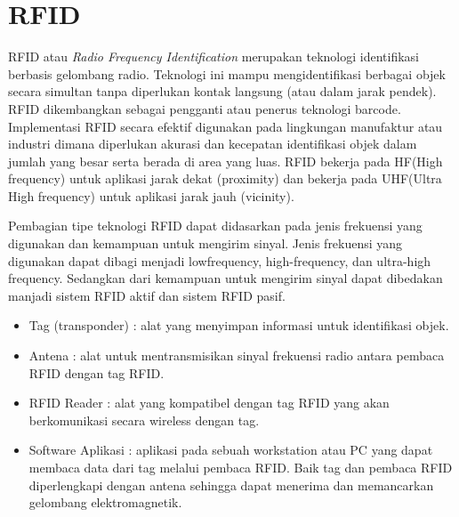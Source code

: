 \section{RFID}
RFID atau \textit{Radio Frequency Identification} merupakan teknologi identifikasi berbasis gelombang radio. Teknologi ini mampu mengidentifikasi berbagai objek secara simultan tanpa diperlukan kontak langsung (atau dalam jarak pendek). RFID dikembangkan sebagai pengganti atau penerus teknologi barcode. Implementasi RFID secara efektif digunakan pada lingkungan manufaktur atau industri dimana diperlukan akurasi dan kecepatan identifikasi objek dalam jumlah yang besar serta berada di area yang luas. RFID bekerja pada HF(High frequency) untuk aplikasi jarak dekat (proximity) dan bekerja pada UHF(Ultra High frequency) untuk aplikasi jarak jauh (vicinity).

Pembagian tipe teknologi RFID dapat didasarkan pada jenis frekuensi yang digunakan dan kemampuan untuk mengirim sinyal. Jenis frekuensi yang digunakan dapat dibagi menjadi lowfrequency, high-frequency, dan ultra-high frequency. Sedangkan dari kemampuan untuk mengirim sinyal dapat dibedakan manjadi sistem RFID aktif dan sistem RFID pasif. 
\begin{itemize}
\item Tag (transponder) : alat yang menyimpan informasi untuk identifikasi objek.
\item Antena : alat untuk mentransmisikan sinyal frekuensi radio antara pembaca RFID dengan tag RFID.
\item RFID Reader : alat yang kompatibel dengan tag RFID yang akan berkomunikasi secara wireless dengan tag.
\item Software Aplikasi : aplikasi pada sebuah workstation atau PC yang dapat membaca data dari tag melalui pembaca RFID. Baik tag dan pembaca RFID diperlengkapi dengan antena sehingga dapat menerima dan memancarkan gelombang elektromagnetik.
\end{itemize}

